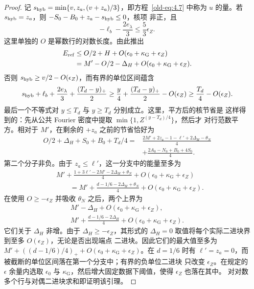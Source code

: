 \begin{proof}
记 $s_{\rm hyb}=\min\{v,z_a,(v+z_a)/3\}$，即方程~\eqref{old-eq:4.7} 中称为
$u$ 的量。若 $s_{\rm hyb}=z_a$，则 $-S_0-B_0+z_a-s_{\rm hyb}\le0$，核项
非正，且
\[
 -\ell_b-\frac{2e_\lambda}{3}\le\frac53\epsilon_Z.
\]
这里单独的 $O$ 是幂数行的对数长度。由此推出
\[
 \begin{aligned}
 E_{\rm ref}&\le O/2+H+O(\epsilon_0+\kappa_{\mathrm G}+\epsilon_Z)\\
 &=M'-O/2-\Delta_H+O(\epsilon_0+\kappa_{\mathrm G}+\epsilon_Z).
 \end{aligned}
\]
否则 $s_{\rm hyb}\ge v/2-O(\epsilon_Z)$，而有界的单位区间蕴含
\[
 s_{\rm hyb}+\ell_b+\frac{2e_\lambda}{3}
       +\frac{(T_d-y)_+}{2}
 \ge \frac y4+\frac{(T_d-y)_+}{2}-O(\epsilon_Z)
 \ge \frac{T_d}{4}-O(\epsilon_Z).
\]
最后一个不等式对 $y\le T_d$ 与 $y\ge T_d$ 分别成立。这里，平方后的核节省是
这样得到的：先从公共 Fourier 密度中提取 $\min\{1,Z^{(y-T_d)/4}\}$，然后才
对行范数平方。相对于 $M'$，在剩余的 $+z_a$ 之前的节省恰好为
\begin{equation}
 \begin{split}
 O/2+\Delta_H+S_0+B_0+T_d/4
 ={}&\frac{2M'+2z_a-1-\ell'+2\Delta_H-\theta_N}{4}\\
    &+\frac{2A_0-N_0+B_0+4S_0}{4}.
 \end{split}
 \label{old-eq:5.3}
\end{equation}
第二个分子非负。由于 $z_a\le\ell'$，这一分支中的能量至多为
\[
 \begin{aligned}
 &M'+\frac{1+3\ell'-2M'-2\Delta_H+\theta_N}{4}
       +O(\epsilon_0+\kappa_{\mathrm G}+\epsilon_Z)\\
 &\qquad=M'+\frac{d-1/6-2\Delta_H+\theta_N}{4}
       +O(\epsilon_0+\kappa_{\mathrm G}+\epsilon_Z).
 \end{aligned}
\]
在使用 $O\ge-\epsilon_Z$ 并吸收 $\theta_N$ 之后，两个上界为
\[
 \begin{gathered}
 M'-\Delta_H+O(\epsilon_0+\kappa_{\mathrm G}+\epsilon_Z),\\
 M'+\frac{d-1/6-2\Delta_H}{4}
       +O(\epsilon_0+\kappa_{\mathrm G}+\epsilon_Z).
 \end{gathered}
\]
它们关于 $\Delta_H$ 非增。由于 $\Delta_H\ge-\epsilon_Z$，其形式的
$\Delta_H=0$ 取值将每个实际二进块界到至多 $O(\epsilon_Z)$，无论是否出现端点
二进块。因此它们的最大值至多为
$M'+((d-1/6)/4)_++O(\epsilon_0+\kappa_{\mathrm G}+\epsilon_Z)$。在 $d=1/6$
时有 $\ell'=z_a=0$，而被截断的单位区间落在第一个分支中；有界的负单位二进块
只改变 $\epsilon_Z$。在规定的 $\epsilon$ 余量内选取 $\epsilon_0$ 与
$\kappa_{\mathrm G}$，然后增大固定数据下阈值，使得 $\epsilon_Z$ 也落在其中。
对对数多个行与对偶二进块求和即证明该引理。
\end{proof}

